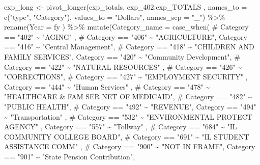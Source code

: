 \documentclass[
  letterpaper,
  DIV=11,
  numbers=noendperiod]{scrreport}
\newenvironment{Shaded}{\begin{snugshade}}{\end{snugshade}}
\newcommand{\AttributeTok}[1]{\textcolor[rgb]{0.40,0.45,0.13}{#1}}
\newcommand{\CommentTok}[1]{\textcolor[rgb]{0.37,0.37,0.37}{#1}}
\newcommand{\FunctionTok}[1]{\textcolor[rgb]{0.28,0.35,0.67}{#1}}
\newcommand{\NormalTok}[1]{\textcolor[rgb]{0.00,0.23,0.31}{#1}}
\newcommand{\OtherTok}[1]{\textcolor[rgb]{0.00,0.23,0.31}{#1}}
\newcommand{\SpecialCharTok}[1]{\textcolor[rgb]{0.37,0.37,0.37}{#1}}
\newcommand{\StringTok}[1]{\textcolor[rgb]{0.13,0.47,0.30}{#1}}
\begin{document}
\begin{Shaded}
\begin{Highlighting}[]
\NormalTok{exp\_long }\OtherTok{\textless{}{-}} \FunctionTok{pivot\_longer}\NormalTok{(exp\_totals, exp\_402}\SpecialCharTok{:}\NormalTok{exp\_TOTALS , }\AttributeTok{names\_to =} \FunctionTok{c}\NormalTok{(}\StringTok{"type"}\NormalTok{, }\StringTok{"Category"}\NormalTok{), }\AttributeTok{values\_to =} \StringTok{"Dollars"}\NormalTok{, }\AttributeTok{names\_sep =} \StringTok{"\_"}\NormalTok{) }\SpecialCharTok{\%\textgreater{}\%} 
  \FunctionTok{rename}\NormalTok{(}\AttributeTok{Year =}\NormalTok{ fy ) }\SpecialCharTok{\%\textgreater{}\%} 
  \FunctionTok{mutate}\NormalTok{(}\AttributeTok{Category\_name =} 
           \FunctionTok{case\_when}\NormalTok{(}
            \CommentTok{\# Category == "402" \textasciitilde{} "AGING" ,}
           \CommentTok{\#  Category == "406" \textasciitilde{} "AGRICULTURE", }
\NormalTok{             Category }\SpecialCharTok{==} \StringTok{"416"} \SpecialCharTok{\textasciitilde{}} \StringTok{"Central Management"}\NormalTok{,}
            \CommentTok{\# Category == "418" \textasciitilde{} "CHILDREN AND FAMILY SERVICES", }
\NormalTok{             Category }\SpecialCharTok{==} \StringTok{"420"} \SpecialCharTok{\textasciitilde{}} \StringTok{"Community Development"}\NormalTok{,}
           \CommentTok{\#  Category == "422" \textasciitilde{} "NATURAL RESOURCES" ,}
            \CommentTok{\# Category == "426" \textasciitilde{} "CORRECTIONS",}
           \CommentTok{\#  Category == "427" \textasciitilde{} "EMPLOYMENT SECURITY" ,}
\NormalTok{             Category }\SpecialCharTok{==} \StringTok{"444"} \SpecialCharTok{\textasciitilde{}} \StringTok{"Human Services"}\NormalTok{ ,}
           \CommentTok{\#  Category == "478" \textasciitilde{} "HEALTHCARE \& FAM SER NET OF MEDICAID", }
           \CommentTok{\#  Category == "482" \textasciitilde{} "PUBLIC HEALTH", }
           \CommentTok{\#  Category == "492" \textasciitilde{} "REVENUE", }
\NormalTok{             Category }\SpecialCharTok{==} \StringTok{"494"} \SpecialCharTok{\textasciitilde{}} \StringTok{"Transportation"}\NormalTok{ ,}
           \CommentTok{\#  Category == "532" \textasciitilde{} "ENVIRONMENTAL PROTECT AGENCY" ,}
\NormalTok{             Category }\SpecialCharTok{==} \StringTok{"557"} \SpecialCharTok{\textasciitilde{}} \StringTok{"Tollway"}\NormalTok{ ,}
           \CommentTok{\#  Category == "684" \textasciitilde{} "IL COMMUNITY COLLEGE BOARD", }
            \CommentTok{\# Category == "691" \textasciitilde{} "IL STUDENT ASSISTANCE COMM" ,}
           \CommentTok{\#  Category == "900" \textasciitilde{} "NOT IN FRAME",}
\NormalTok{             Category }\SpecialCharTok{==} \StringTok{"901"} \SpecialCharTok{\textasciitilde{}} \StringTok{"State Pension Contribution"}\NormalTok{,}

\end{Highlighting}
\end{Shaded}
\end{document}
